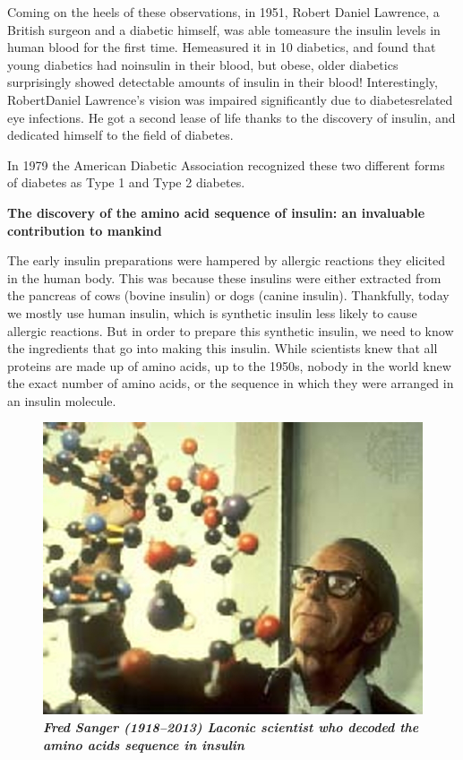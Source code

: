 Coming on the heels of these observations, in 1951, Robert Daniel Lawrence, a British surgeon and a diabetic himself, was able to\break measure the insulin levels in human blood for the first time. He\break measured it in 10 diabetics, and found that young diabetics had no\break insulin in their blood, but obese, older diabetics surprisingly showed detectable amounts of insulin in their blood! Interestingly, Robert\break Daniel Lawrence’s vision was impaired significantly due to diabetes\break related eye infections. He got a second lease of life thanks to the disco\-very of insulin, and dedicated himself to the field of diabetes.

In 1979 the American Diabetic Association recognized these two different forms of diabetes as Type 1 and Type 2 diabetes.

\noindent
\textbf{The discovery of the amino acid sequence of insulin: an invaluable contribution to mankind}

The early insulin preparations were hampered by allergic reactions they elicited in the human body. This was because these insulins were either extracted from the pancreas of cows (bovine insulin) or dogs (canine insulin). Thankfully, today we mostly use human insulin, which is synthetic insulin less likely to cause allergic reactions. But in order to prepare this synthetic insulin, we need to know the ingredients that go into making this insulin. While scientists knew that all proteins are made up of amino acids, up to the 1950s, nobody in the world knew the exact number of amino acids, or the sequence in which they were arranged in an insulin molecule.

\begin{figure}
\centering
\includegraphics[scale=.9]{images/016.jpg}\\
\textbf{\textit{Fred Sanger (1918–2013) Laconic scientist who decoded the amino acids sequence in insulin}}
\end{figure}

